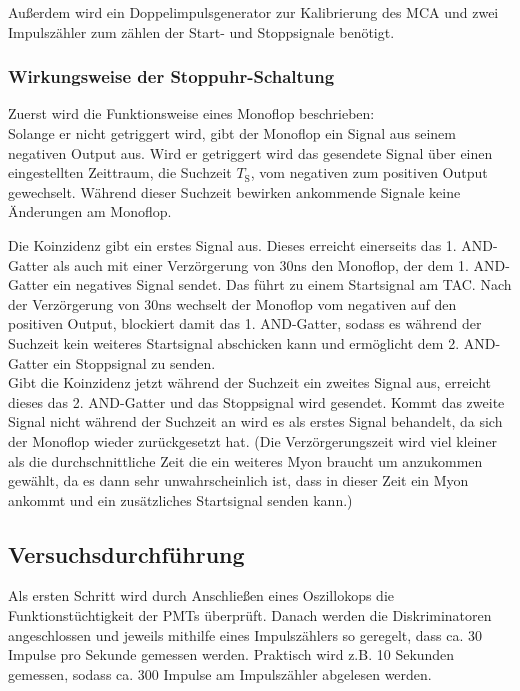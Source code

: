         Außerdem wird ein Doppelimpulsgenerator zur Kalibrierung des MCA und zwei Impulszähler zum zählen der Start- und Stoppsignale benötigt.

    \subsubsection{Wirkungsweise der Stoppuhr-Schaltung}
        Zuerst wird die Funktionsweise eines Monoflop beschrieben: \\
        Solange er nicht getriggert wird, gibt der Monoflop ein Signal aus seinem negativen Output aus.
        Wird er getriggert wird das gesendete Signal über einen eingestellten Zeittraum, die Suchzeit $T_{\text{S}}$, vom negativen zum positiven Output gewechselt. Während dieser Suchzeit bewirken ankommende Signale keine Änderungen am Monoflop.

        Die Koinzidenz gibt ein erstes Signal aus. Dieses erreicht einerseits das 1. AND-Gatter als auch mit einer Verzörgerung von $30$ns den Monoflop, der dem 1. AND-Gatter ein negatives Signal sendet. Das führt zu einem Startsignal am TAC. Nach der Verzörgerung von $30$ns wechselt der Monoflop vom negativen auf den positiven Output, blockiert damit das 1. AND-Gatter, sodass es während der Suchzeit kein weiteres Startsignal abschicken kann und ermöglicht dem 2. AND-Gatter ein Stoppsignal zu senden. \\
        Gibt die Koinzidenz jetzt während der Suchzeit ein zweites Signal aus, erreicht dieses das 2. AND-Gatter und das Stoppsignal wird gesendet. Kommt das zweite Signal nicht während der Suchzeit an wird es als erstes Signal behandelt, da sich der Monoflop wieder zurückgesetzt hat. (Die Verzörgerungszeit wird viel kleiner als die durchschnittliche Zeit die ein weiteres Myon braucht um anzukommen gewählt, da es dann sehr unwahrscheinlich ist, dass in dieser Zeit ein Myon ankommt und ein zusätzliches Startsignal senden kann.)

    \subsection{Versuchsdurchführung}
        Als ersten Schritt wird durch Anschließen eines Oszillokops die Funktionstüchtigkeit der PMTs überprüft. Danach werden die Diskriminatoren angeschlossen und jeweils mithilfe eines Impulszählers so geregelt, dass ca. 30 Impulse pro Sekunde gemessen werden. Praktisch wird z.B. 10 Sekunden gemessen, sodass ca. 300 Impulse am Impulszähler abgelesen werden.


